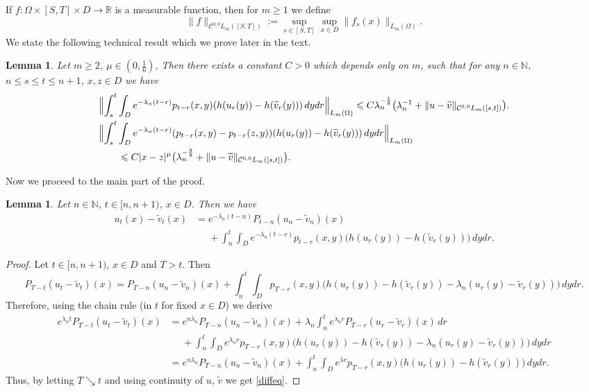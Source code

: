 \documentclass[12pt]{article}
\newtheorem{lemma}[theorem]{Lemma}
\theoremstyle{definition}
\DeclareMathOperator{\1}{\mathbbm{1}}%
\renewcommand{\ge}{\geqslant}
\renewcommand{\le}{\leqslant}
\newcommand{\nn}{\nonumber}
\newcommand{\wt}{\widetilde}
\newcommand{\C}{\mathcal{C}}
\newcommand{\N}{\mathbb{N}}
\newcommand{\R}{\mathbb{R}}
\begin{document}
If $f\colon\Omega\times [S,T]\times D\to\R$ is a measurable function, then for 
$m\ge1$ we define
\begin{equation}\label{fullsnormsde}
\|f\|_{\C^{0,0}L_m([S,T])}:=\sup_{s\in[S,T]}\sup_{x\in D}\|f_s(x)\|_{L_m(\Omega)}.
\end{equation}	
We state the following technical result which we prove later in the text.
\begin{lemma}\label{L:main}
Let $m\ge2$,  $\mu\in(0,\frac16)$, Then there exists a constant $C>0$ which depends only on $m$, such that for any $n\in\N$, $n\le s \le t\le n+1$, $x,z\in D$  we have 
\begin{align}\label{sdeb2}
&\Bigl\|\int_s^t \int_D e^{-\lambda_n(t-r)}p_{t-r}(x,y)(h(u_r(y))-h(\wt v_r(y)))\,dy dr\Bigr\|_{L_m(\Omega)}\le  C\lambda_n^{-\frac18}\bigl(\lambda_n^{-1}+ \|u-\wt v\|_{\C^{0,0}L_m([s,t])}\bigr). \\
  	&\Bigl\|\int_s^t \int_D e^{-\lambda_n(t-r)}(p_{t-r}(x,y)-p_{t-r}(z,y))(h(u_r(y))-h(\wt v_r(y)))\,dy dr\Bigr\|_{L_m(\Omega)}\nn\\
	&\qquad\le 
	C |x-z|^{\mu} \bigl(\lambda_n^{-\frac98}+\|u-\wt v\|_{\C^{0,0}L_m([s,t])}\bigr). \label{sdeb3}
\end{align}
\end{lemma}

Now we proceed to the main part of the proof.
\begin{lemma}\label{l:diffl}
Let $n\in\N$, $t\in[n,n+1)$, $x\in D$. Then  we have 
\begin{align}\label{diffeq}
u_t(x)-\wt v_t(x)&=e^{-\lambda_n(t-n)} P_{t-n}(u_n-\wt v_n)(x)\nn\\
&\phantom{=}+ \int_n^t\int_D e^{-\lambda_n (t- r) } p_{t-r}(x,y)\bigl(h(u_r(y))-h(\wt v_r(y))\bigr)\,dy dr. 
\end{align}
\end{lemma}
\begin{proof}
Let $t\in[n,n+1)$, $x\in D$ and $T>t$. Then 
$$P_{T-t}(u_t-\wt v_t)(x)=P_{T-n}(u_n-\wt v_n)(x)+\int_n^t\int_D p_{T-r}(x,y) \bigl(h(u_r(y))-h(\wt v_r(y))-\lambda_n(u_r(y)-\wt v_r(y))\bigr)\,dydr.
$$ 
Therefore, using the chain rule (in $t$ for fixed $x\in D$) we derive 	
\begin{align*}
e^{\lambda_n t}P_{T-t}(u_t-\wt v_t)(x)&=e^{n \lambda_n } P_{T-n}(u_n-\wt v_n)(x)+
	\lambda_n\int_n^t e^{\lambda_n r } P_{T-r}(u_r-\wt v_r)(x)\,dr\\
		&\phantom{=}+
		\int_n^t\int_D e^{\lambda_n r } p_{T-r}(x,y) \bigl(h(u_r(y))-h(\wt v_r(y))-\lambda_n(u_r(y)-\wt v_r(y))\bigr)\,dydr\\
		&=e^{n \lambda_n } P_{T-n}(u_n-\wt v_n)(x)+ \int_n^t\int_D e^{\lambda r } p_{T-r}(x,y)\bigl(h(u_r(y))-h(\wt v_r(y))\bigr)\,dy dr. 
	\end{align*}
Thus, by letting $T\searrow t$ and using continuity of $u$, $\wt v$ we get \eqref{diffeq}.
\end{proof}
 
\end{document}
